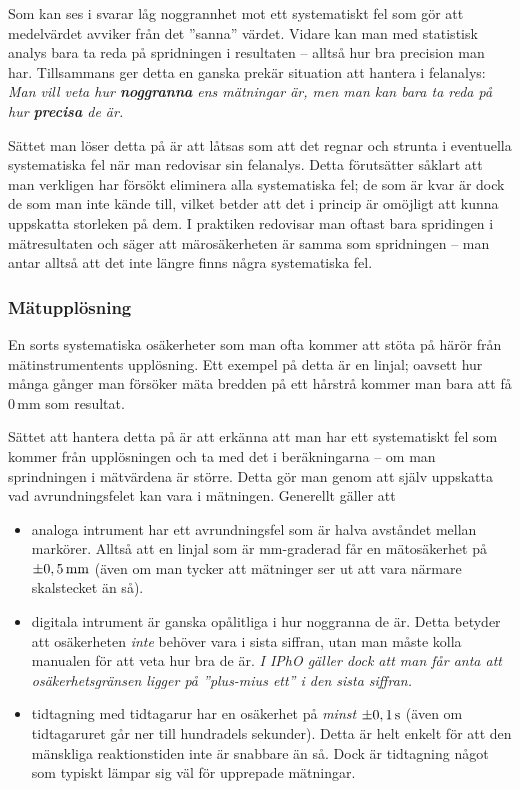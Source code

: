 \documentclass[11pt,a4paper, swedish
]{article}
\newcounter{exempel_counter}%
\begin{document}
Som kan ses i  svarar låg noggrannhet mot ett
systematiskt fel som gör att medelvärdet avviker från det ''sanna''
värdet. Vidare kan man med statistisk analys bara ta reda på
spridningen i resultaten -- alltså hur bra precision man
har. Tillsammans ger detta en ganska prekär situation att hantera i
felanalys: 
\emph{Man vill veta hur {\bf noggranna} ens mätningar är, men man kan bara
  ta reda på hur {\bf precisa} de är.} 

Sättet man löser detta på är att låtsas som att det regnar och strunta
i eventuella systematiska fel när man redovisar sin felanalys. Detta
förutsätter såklart att man verkligen har försökt eliminera alla
systematiska fel; de som är kvar är dock de som man inte kände till,
vilket betder att det i princip är omöjligt att kunna uppskatta
storleken på dem. I praktiken redovisar man oftast bara spridingen i
mätresultaten och säger att märosäkerheten är samma som spridningen --
man antar alltså att det inte längre finns några systematiska fel. 

\subsubsection{Mätupplösning}
En sorts systematiska\footnotemark{} osäkerheter som man ofta kommer
att stöta på härör från mätinstrumentents upplösning. Ett exempel på
detta är en linjal; oavsett hur många gånger man försöker mäta bredden
på ett hårstrå kommer man bara att få 0\,mm som resultat. 

Sättet att hantera detta på är att erkänna att man har ett
systematiskt fel som kommer från upplösningen och ta med det i
beräkningarna -- om man sprindningen i mätvärdena är större. Detta gör
man genom att själv uppskatta vad avrundningsfelet kan vara i
mätningen. Generellt gäller att 
\begin{itemize}
\item analoga intrument har ett avrundningsfel som är halva
  avståndet mellan markörer. Alltså att en linjal som är mm-graderad
  får en mätosäkerhet på $\pm\unit[0,5]{mm}$ (även om man tycker att
  mätninger ser ut att vara närmare skalstecket än så).
\item digitala intrument är ganska opålitliga i hur noggranna de
  är. Detta betyder att osäkerheten \emph{inte} behöver vara i sista
  siffran, utan man måste kolla manualen för att veta hur bra de är. 
  \emph{I IPhO gäller dock att man får anta att osäkerhetsgränsen
    ligger på ''plus-mius ett'' i den sista siffran.} 
\item tidtagning med tidtagarur har en osäkerhet på \emph{minst}
  $\pm\unit[0,1]{s}$ (även om tidtagaruret går ner till hundradels
  sekunder). Detta är helt enkelt för att den mänskliga reaktionstiden
  inte är snabbare än så. Dock är tidtagning något som typiskt lämpar
  sig väl för upprepade mätningar.
\end{itemize}
\end{document}
